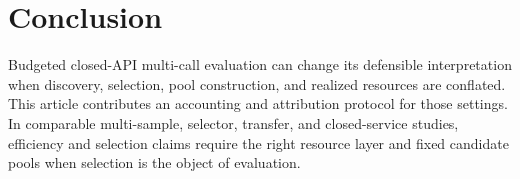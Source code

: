 \section{Conclusion}
\label{sec:conclusion}

Budgeted closed-API multi-call evaluation can change its defensible interpretation when discovery,
selection, pool construction, and realized resources are conflated. This article contributes an
accounting and attribution protocol for those settings. In comparable multi-sample, selector,
transfer, and closed-service studies, efficiency and selection claims require the right resource
layer and fixed candidate pools when selection is the object of evaluation.
